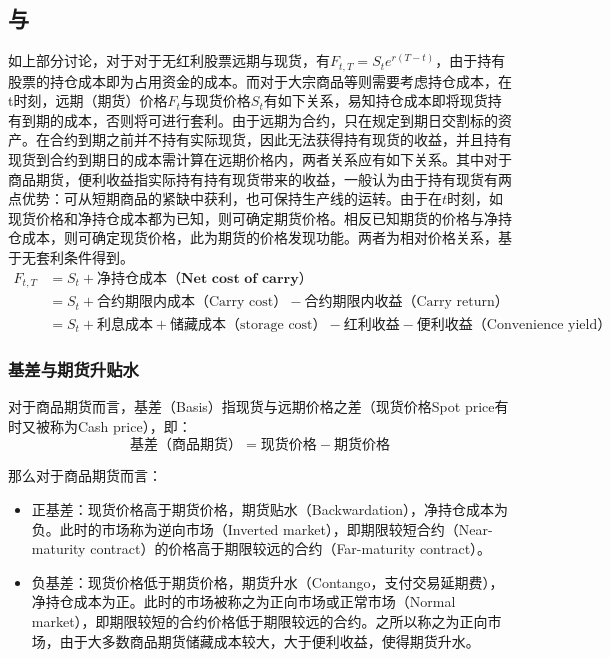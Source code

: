 \documentclass[11pt]{article}
\begin{document}
\subsection{与}

如上部分讨论，对于对于无红利股票远期与现货，有$F_{t,T} = S_t e^{r(T-t)}$，由于持有股票的持仓成本即为占用资金的成本。而对于大宗商品等则需要考虑持仓成本，在t时刻，远期（期货）价格$F_t$与现货价格$S_t$有如下关系，易知持仓成本即将现货持有到期的成本，否则将可进行套利。由于远期为合约，只在规定到期日交割标的资产。在合约到期之前并不持有实际现货，因此无法获得持有现货的收益，并且持有现货到合约到期日的成本需计算在远期价格内，两者关系应有如下关系。其中对于商品期货，便利收益指实际持有持有现货带来的收益，一般认为由于持有现货有两点优势：可从短期商品的紧缺中获利，也可保持生产线的运转。由于在$t$时刻，如现货价格和净持仓成本都为已知，则可确定期货价格。相反已知期货的价格与净持仓成本，则可确定现货价格，此为期货的价格发现功能。两者为相对价格关系，基于无套利条件得到。
\begin{align*}
    F_{t,T} &= S_t + \textbf{净持仓成本（Net cost of carry）} \\
    &= S_t + \text{合约期限内成本（Carry cost）} - \text{合约期限内收益（Carry return）} \\
    &= S_t + \text{利息成本} + \text{储藏成本（storage cost）} - \text{红利收益} - \text{便利收益（Convenience yield）}
\end{align*}

\subsubsection*{基差与期货升贴水}

对于商品期货而言，基差（Basis）指现货与远期价格之差（现货价格Spot price有时又被称为Cash price），即：
\begin{equation*}
    \text{基差（商品期货）} = \text{现货价格} - \text{期货价格}
\end{equation*}

那么对于商品期货而言：
\begin{itemize}
    \item 正基差：现货价格高于期货价格，期货贴水（Backwardation），净持仓成本为负。此时的市场称为逆向市场（Inverted market），即期限较短合约（Near-maturity contract）的价格高于期限较远的合约（Far-maturity contract）。
    \item 负基差：现货价格低于期货价格，期货升水（Contango，支付交易延期费），净持仓成本为正。此时的市场被称之为正向市场或正常市场（Normal market），即期限较短的合约价格低于期限较远的合约。之所以称之为正向市场，由于大多数商品期货储藏成本较大，大于便利收益，使得期货升水。
\end{itemize}
\end{document}
